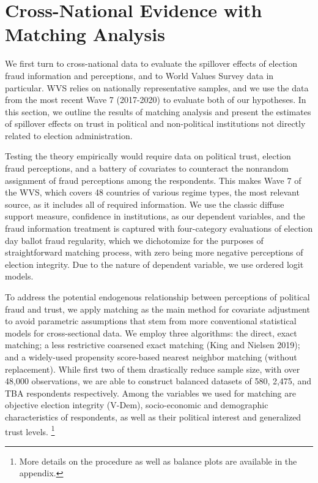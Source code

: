 \documentclass[11pt, ngerman,english,a4]{article}
\begin{document}
\newpage

\section*{Cross-National Evidence with Matching Analysis}

We first turn to cross-national data to evaluate the spillover effects of election fraud information and perceptions, and to World Values Survey data in particular. WVS relies on nationally representative samples, and we use the data from the most recent Wave 7 (2017-2020) to evaluate both of our hypotheses. In this section, we outline the results of matching analysis and present the estimates of spillover effects on trust in political and non-political institutions not directly related to election administration. 

Testing the theory empirically would require data on political trust, election fraud perceptions, and a battery of covariates to counteract the nonrandom assignment of fraud perceptions among the respondents. This makes Wave 7 of the WVS, which covers 48 countries of various regime types, the most relevant source, as it includes all of required information. We use the classic diffuse support  \citealt{Easton1965, Easton1975} measure, confidence in institutions, as our dependent variables, and the fraud information treatment is captured with four-category evaluations of election day ballot fraud regularity, which we dichotomize for the purposes of straightforward matching process, with zero being more negative perceptions of election integrity. Due to the nature of dependent variable, we use ordered logit models. 

To address the potential endogenous relationship between perceptions of political fraud and trust, we apply matching as the main method for covariate adjustment to avoid parametric assumptions that stem from more conventional statistical models for cross-sectional data. 
We employ three algorithms: the direct, exact matching; a less restrictive coarsened exact matching (King and Nielsen 2019); and a widely-used propensity score-based nearest neighbor matching (without replacement). While first two of them drastically reduce sample size, with over 48,000 observations, we are able to construct balanced datasets of 580, 2,475, and TBA respondents respectively. Among the variables we used for matching are objective election integrity (V-Dem), socio-economic and demographic characteristics of respondents, as well as their political interest and generalized trust levels. \footnote{More details on the procedure as well as balance plots are available in the appendix.}
\end{document}
